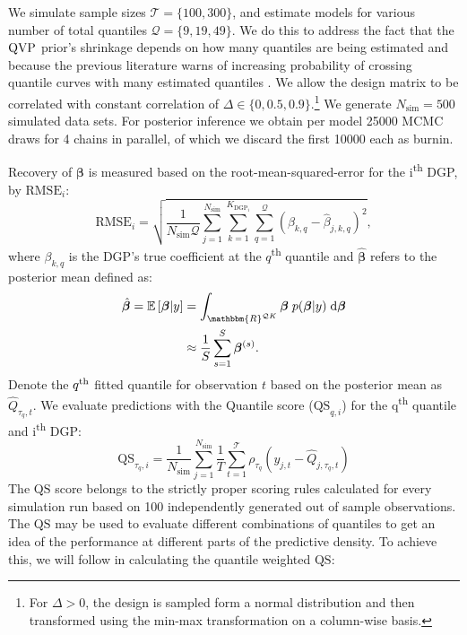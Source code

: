 %
We simulate sample sizes $\mathcal{T}=\{100,300\}$, and estimate models for various number of total quantiles $\mathcal{Q}=\{9,19,49\}$. We do this to address the fact that the $\operatorname{QVP}$ prior's shrinkage depends on how many quantiles are being estimated and because the previous literature warns of increasing probability of crossing quantile curves with many estimated quantiles \citep{jiang2013interquantile}. We allow the design matrix to be correlated with constant correlation of $\varDelta \in \{0, 0.5, 0.9\}$.\footnote{For $\varDelta>0$, the design is sampled form a normal distribution and then transformed using the min-max transformation on a column-wise basis.} We generate $N_{\mathrm{sim}} = 500$ simulated data sets. For posterior inference we obtain per model 25000 MCMC draws for 4 chains in parallel, of which we discard the first 10000 each as burnin.  %
%

Recovery of $\boldsymbol{\beta}$ is measured based on the root-mean-squared-error for the i\textsuperscript{th} DGP, by $\mathrm{RMSE}_i$:
%
\begin{equation} \label{eq:rmse_def}
    \mathrm{RMSE}_i =  \sqrt{\frac{1}{N_{\mathrm{sim}}\mathcal{Q}}\sum_{j = 1}^{N_{\mathrm{sim}}}\sum_{k=1}^{K_{\mathrm{DGP}_{i}}} \sum_{q=1}^{\mathcal{Q}} \left( {\beta_{k,q}} - {{\hat{\beta}_{j,k,q}}} \right)^2},
\end{equation}
%
where $\beta_{k,q}$ is the DGP's true coefficient at the $q$\textsuperscript{th} quantile and $\hat{\boldsymbol{\beta}}$ refers to the posterior mean defined as: 
\begin{equation}
    \begin{split}
        \hat{\boldsymbol{\beta}} = \E{\boldsymbol{\beta}|y} &  = \int_{\mathbbm{R}^{\mathcal{Q}K}}\boldsymbol{\beta} \; p(\boldsymbol{\beta}|y)\;\mathrm{d}\boldsymbol{\beta} \\
        & \approx \frac{1}{S}\sum_{s = 1}^S \boldsymbol{\beta}^{(s)}.
    \end{split}
\end{equation}
%
Denote the $q\textsuperscript{th}$ fitted quantile for observation $t$ based on the posterior mean as $\hat{Q}_{\tau_q,t}$. We evaluate predictions with the Quantile score ($\mathrm{QS}_{q,i}$) for the q\textsuperscript{th} quantile and i\textsuperscript{th} DGP:
%
\begin{equation}
    \mathrm{QS}_{\tau_q,i} =  \frac{1}{N_{\mathrm{sim}}}\sum_{j = 1}^{N_{\mathrm{sim}}} \frac{1}{T}\sum^\mathcal{T}_{t=1}\rho_{\tau_q}\left( {y_{j,t}} - \hat{Q}_{j,\tau_q,t} \right)
\end{equation}
%
The $\mathrm{QS}$ score belongs to the strictly proper scoring rules \citep{gneiting_strictly_2007} calculated for every simulation run based on 100 independently generated out of sample observations. The $\mathrm{QS}$ may be used to evaluate different combinations of quantiles to get an idea of the performance at different parts of the predictive density. To achieve this, we will follow \citet{gneiting2011comparing} in calculating the quantile weighted $\mathrm{QS}$:


